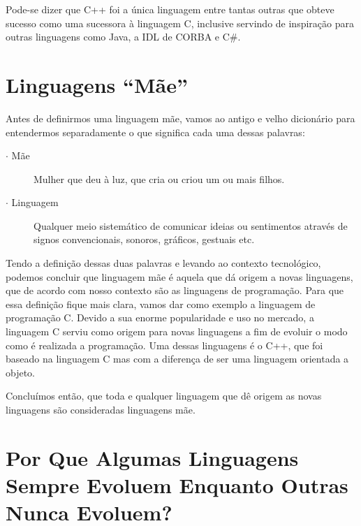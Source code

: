 \documentclass[
    12pt,               %
    openright,          %
    twoside,            %
    a4paper,            %
    brazil              %
    ]{abntex2}
\begin{document}
Pode-se dizer que C++ foi a única linguagem entre tantas outras que obteve
sucesso como uma sucessora à linguagem C, inclusive servindo de inspiração para
outras linguagens como Java, a IDL de CORBA e C\#.\cite{CPP}

\chapter{Linguagens “Mãe”}

Antes de definirmos uma linguagem mãe, vamos ao antigo e velho dicionário para
entendermos separadamente o que significa cada uma dessas palavras: 

\begin{description} \item[$\cdot$ Mãe] Mulher que deu à luz, que cria ou criou
um ou mais filhos.  \item[$\cdot$ Linguagem] Qualquer meio sistemático de
comunicar ideias ou sentimentos através de signos convencionais, sonoros,
gráficos, gestuais etc.
\end{description}

Tendo a definição dessas duas palavras e levando ao contexto tecnológico,
podemos concluir que linguagem mãe é aquela que dá origem a novas linguagens,
que de acordo com nosso contexto são as linguagens de programação.  Para que
essa definição fique mais clara, vamos dar como exemplo a linguagem de
programação C. Devido a sua enorme popularidade e uso no mercado, a linguagem C
serviu como origem para novas linguagens a fim de evoluir o modo como é
realizada a programação. Uma dessas linguagens é o C++, que foi baseado na
linguagem C mas com a diferença de ser uma linguagem orientada a objeto.

Concluímos então, que toda e qualquer linguagem que dê origem as novas
linguagens são consideradas linguagens mãe.

\chapter{Por Que Algumas Linguagens Sempre Evoluem Enquanto Outras Nunca Evoluem?}
\end{document}
